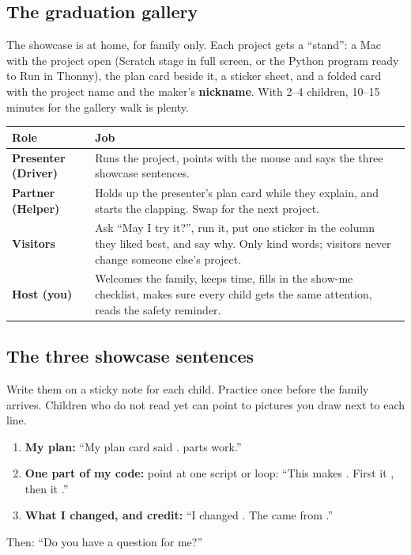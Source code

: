 \documentclass[track=junior,level=3,teacher]{kidscode}
\begin{document}
\subsection{The graduation gallery}
The showcase is at home, for family only. Each project gets a \enquote{stand}: a Mac with the project open
(Scratch stage in full screen, or the Python program ready to Run in Thonny), the plan card beside it, a
sticker sheet, and a folded card with the project name and the maker's \textbf{nickname}. With 2--4
children, 10--15 minutes for the gallery walk is plenty.

\begin{center}\small\renewcommand{\arraystretch}{1.3}
\begin{tabularx}{\linewidth}{@{}>{\bfseries}p{3.0cm}X@{}}
\toprule
Role & Job\\
\midrule
Presenter (Driver) & Runs the project, points with the mouse and says the three showcase sentences.\\
Partner (Helper) & Holds up the presenter's plan card while they explain, and starts the clapping. Swap for the next project.\\
Visitors & Ask \enquote{May I try it?}, run it, put one sticker in the column they liked best, and say why. Only kind words; visitors never change someone else's project.\\
Host (you) & Welcomes the family, keeps time, fills in the show-me checklist, makes sure every child gets the same attention, reads the safety reminder.\\
\bottomrule
\end{tabularx}
\end{center}

\subsection{The three showcase sentences}
Write them on a sticky note for each child. Practice once before the family arrives. Children who do not
read yet can point to pictures you draw next to each line.
\begin{enumerate}[itemsep=2pt]
  \item \textbf{My plan:} \enquote{My plan card said \underline{\hspace{4cm}}. \underline{\hspace{1.2cm}} parts work.}
  \item \textbf{One part of my code:} point at one script or loop: \enquote{This \underline{\hspace{2.5cm}} makes
        \underline{\hspace{3cm}}. First it \underline{\hspace{2.5cm}}, then it \underline{\hspace{2.5cm}}.}
  \item \textbf{What I changed, and credit:} \enquote{I changed \underline{\hspace{3cm}}. The
        \underline{\hspace{2.5cm}} came from \underline{\hspace{3cm}}.}
\end{enumerate}
Then: \enquote{Do you have a question for me?}
\end{document}
